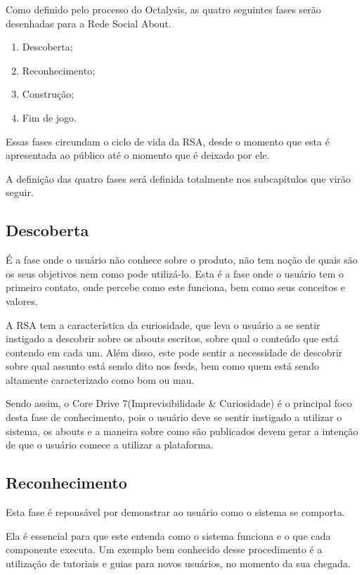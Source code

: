 Como definido pelo processo do Octalysis, as quatro seguintes fases serão
desenhadas para a Rede Social About.

\begin{enumerate}
    \item Descoberta;
    \item Reconhecimento;
    \item Construção;
    \item Fim de jogo.
\end{enumerate}

Essas fases circundam o ciclo de vida da RSA, desde o momento que esta
é apresentada ao público até o momento que é deixado por ele. 

A definição das quatro fases será definida totalmente nos subcapítulos que virão seguir.

\subsection{Descoberta}
\label{sub:descoperta}
É a fase onde o usuário não conhece sobre o produto, não tem noção de quais são os
seus objetivos nem como pode utilizá-lo. Esta é a fase onde o usuário tem o primeiro
contato, onde percebe como este funciona, bem como seus conceitos e valores.

A RSA tem a característica da curiosidade, que leva o usuário a se sentir instigado
a descobrir sobre os abouts escritos, sobre qual o conteúdo que está contendo em cada
um. Além disso, este pode sentir a necessidade de descobrir sobre qual assunto está
sendo dito nos feeds, bem como quem está sendo altamente caracterizado como bom ou mau.

Sendo assim, o Core Drive 7(Imprevisibilidade \& Curiosidade) é o principal foco desta fase
de conhecimento, pois o usuário deve se sentir instigado a utilizar o sistema, os abouts
e a maneira sobre como são publicados  devem gerar a intenção de que o usuário comece a utilizar
a plataforma.


\subsection{Reconhecimento}
\label{sub:reconhecimento}
Esta fase é reponsável por demonstrar ao usuário como o sistema se comporta.

Ela é essencial para que este entenda como o sistema funciona e o que cada
componente executa. Um exemplo bem conhecido desse procedimento é a utilização
de tutoriais e guias para novos usuários, no momento da sua chegada.


